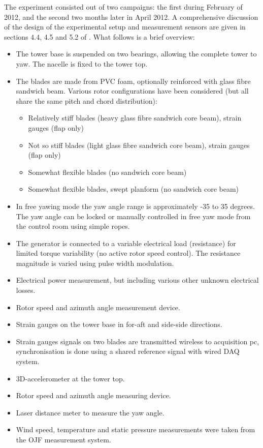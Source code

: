\documentclass[a4paper]{jpconf}
\begin{document}

The experiment consisted out of two campaigns: the first during February of 2012, and the second two months later in April 2012. A comprehensive discussion of the design of the experimental setup and measurement sensors are given in sections 4.4, 4.5 and 5.2 of \cite{verelst_numerical_2013:diss}. What follows is a brief overview:

\begin{itemize}
	\item The tower base is suspended on two bearings, allowing the complete tower to yaw. The nacelle is fixed to the tower top.
	\item The blades are made from PVC foam, optionally reinforced with glass fibre sandwich beam. Various rotor configurations have been considered (but all share the same pitch and chord distribution):
	\begin{itemize}
		\item Relatively stiff blades (heavy glass fibre sandwich core beam), strain gauges (flap only)
		\item Not so stiff blades (light glass fibre sandwich core beam), strain gauges (flap only)
		\item Somewhat flexible blades (no sandwich core beam)
		\item Somewhat flexible blades, swept planform (no sandwich core beam)
	\end{itemize}
	\item In free yawing mode the yaw angle range is approximately -35 to 35 degrees. The yaw angle can be locked or manually controlled in free yaw mode from the control room using simple ropes.
	\item The generator is connected to a variable electrical load (resistance) for limited torque variability (no active rotor speed control). The resistance magnitude is varied using pulse width modulation.
	\item Electrical power measurement, but including various other unknown electrical losses.
	\item Rotor speed and azimuth angle measurement device.
	\item Strain gauges on the tower base in for-aft and side-side directions.
	\item Strain gauges signals on two blades are transmitted wireless to acquisition pc, synchronisation is done using a shared reference signal with wired DAQ system.
	\item 3D-accelerometer at the tower top.
	\item Rotor speed and azimuth angle measuring device.
	\item Laser distance meter to measure the yaw angle.
	\item Wind speed, temperature and static pressure measurements were taken from the  OJF measurement system.
\end{itemize}
\end{document}
